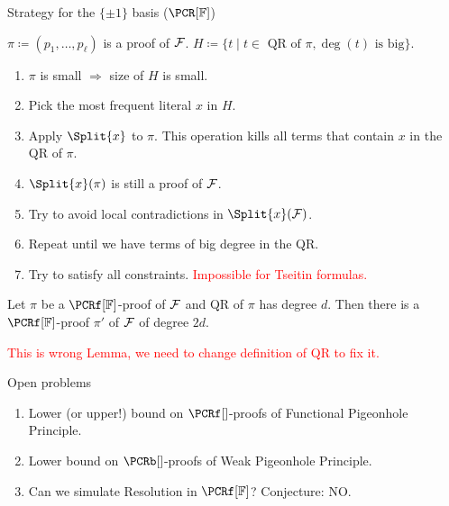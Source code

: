 \begin{frame}{Strategy for the $\{\pm 1\}$ basis ($\PCR[\field]$)}
    
    $\pi \coloneqq (p_1, \dots, p_{\ell})$ is a proof of $\mathcal{F}$. $H \coloneqq \{t \mid t \in \text{ QR of }
    \pi, \deg(t) \text{ is big}\}$.

    \begin{enumerate}
        \item $\pi$ is small $\Rightarrow$ size of $H$ is small.
        \pause
        \item Pick the most frequent literal $x$ in $H$.
        \pause
        \item Apply $\Split{x}$ to $\pi$. This operation kills all terms that contain $x$ in the QR of $\pi$.
        \pause
        \item $\Split{x}(\pi)$ is still a proof of  $\mathcal{F}$.
        \pause
        \item Try to avoid local contradictions in $\Split{x}(\Fs)$. 
        \pause
        \item Repeat until we have terms of big degree in the QR.
        \vspace{0.3cm}
        \pause
        \item Try to satisfy all  constraints. \pause \textcolor{red}{Impossible for
            Tseitin formulas.}
    \end{enumerate}

    \pause
    \begin{lemma}
        Let $\pi$ be a $\PCRf[\field]$-proof of $\mathcal{F}$ and QR of $\pi$ has degree $d$. Then there is a
        $\PCRf[\field]$-proof $\pi'$ of $\mathcal{F}$ of degree $2d$.
    \end{lemma}
    \pause
    \textcolor{red}{This is wrong Lemma, we need to change definition of QR to fix it.}
\end{frame}


\begin{frame}{Open problems}

    \begin{enumerate}
        \item Lower (or upper!) bound on $\PCRf[]$-proofs of Functional Pigeonhole Principle.
        \item Lower bound on $\PCRb[]$-proofs of Weak Pigeonhole Principle.

            
        \pause
        \item Can we simulate Resolution in $\PCRf[\field]$? \pause Conjecture: NO.
    \end{enumerate}
\end{frame}